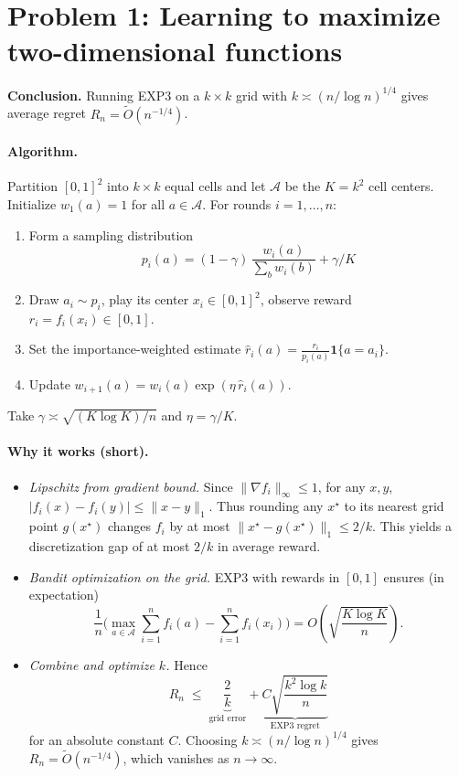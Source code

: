 \documentclass[11pt]{article}
\renewenvironment{shaded}{%
  \def\FrameCommand{\fboxsep=\FrameSep \colorbox{shadecolor}}%
  \MakeFramed{\advance\hsize-\width \FrameRestore\FrameRestore}}%
 {\endMakeFramed}
\begin{document}
\begin{shaded}
\section*{Problem 1: Learning to maximize two-dimensional functions}
\textbf{Conclusion.} Running EXP3 on a $k\times k$ grid with $k \asymp (n/\log n)^{1/4}$ gives average regret $R_n=\tilde{O}(n^{-1/4})$.

\paragraph{Algorithm.}
Partition $[0,1]^2$ into $k\times k$ equal cells and let $\mathcal{A}$ be the $K=k^2$ cell centers.
Initialize $w_1(a)=1$ for all $a\in\mathcal{A}$. For rounds $i=1,\dots,n$:
\begin{enumerate}
\item Form a sampling distribution 
\[
p_i(a)=(1-\gamma)\,\frac{w_i(a)}{\sum_{b}w_i(b)}+\gamma/K
\]
\item Draw $a_i\sim p_i$, play its center $x_i\in[0,1]^2$, observe reward $r_i=f_i(x_i)\in[0,1]$.
\item Set the importance-weighted estimate $\hat r_i(a)=\frac{r_i}{p_i(a)}\mathbf{1}\{a=a_i\}$.
\item Update $w_{i+1}(a)=w_i(a)\exp(\eta\,\hat r_i(a))$.
\end{enumerate}
Take $\gamma \asymp \sqrt{(K\log K)/n}$ and $\eta=\gamma/K$.

\paragraph{Why it works (short).}
\begin{itemize}
\item \emph{Lipschitz from gradient bound.} Since $\|\nabla f_i\|_\infty\le 1$, for any $x,y$,
$|f_i(x)-f_i(y)|\le \|x-y\|_1$. Thus rounding any $x^\star$ to its nearest grid point $g(x^\star)$ changes $f_i$ by at most $\|x^\star-g(x^\star)\|_1\le 2/k$.
This yields a discretization gap of at most $2/k$ in average reward.
\item \emph{Bandit optimization on the grid.} EXP3 with rewards in $[0,1]$ ensures (in expectation)
\[
\frac{1}{n}\Big(\max_{a\in\mathcal{A}}\sum_{i=1}^n f_i(a)-\sum_{i=1}^n f_i(x_i)\Big)
= O\!\left(\sqrt{\frac{K\log K}{n}}\right).
\]
\item \emph{Combine and optimize $k$.} Hence
\[
R_n \;\le\; \underbrace{\frac{2}{k}}_{\text{grid error}}
+\underbrace{C\sqrt{\frac{k^2\log k}{n}}}_{\text{EXP3 regret}}
\]
for an absolute constant $C$. Choosing $k\asymp (n/\log n)^{1/4}$ gives
$R_n=\tilde{O}(n^{-1/4})$, which vanishes as $n\to\infty$.
\end{itemize}


\end{shaded}
\end{document}
